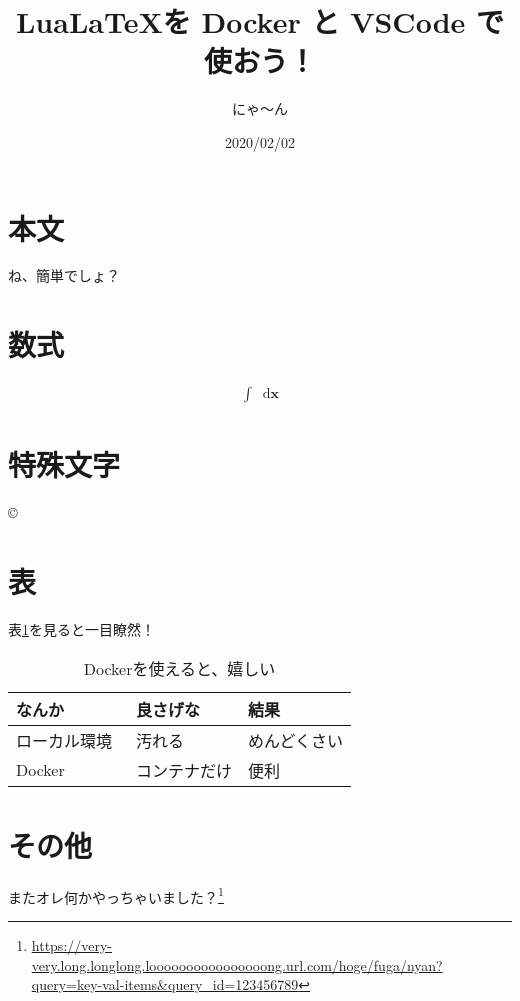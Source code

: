 \documentclass[a4paper,10pt]{ltjsarticle}
\title{Lua\LaTeX を Docker と VSCode で使おう！}
\author{にゃ〜ん}
\date{2020/02/02}
\newcommand*\diff[1]{\mathop{}\!\mathrm{d}#1}
\begin{document}
\maketitle

\tableofcontents
\thispagestyle{empty}
\newpage

\setcounter{page}{1}
\section{本文}
ね、簡単でしょ？

\section{数式}
\begin{align*}
\int \diff{\bm{x}}
\end{align*}

\section{特殊文字}
\copyright
\textyen
\textregistered

\section{表}
表\ref{table:table1}を見ると一目瞭然！

\begin{table}[tb]
\caption{Dockerを使えると、嬉しい}\label{table:table1}
\begin{center}
\begin{tabularx}{\linewidth}{@{}XXX@{}} \toprule
なんか & 良さげな & 結果 \\ \midrule
ローカル環境~\cite{local} & 汚れる & めんどくさい \\
Docker~\cite{docker} & コンテナだけ & 便利 \\\bottomrule
\end{tabularx}
\end{center}
\end{table}

\section{その他}
またオレ何かやっちゃいました？\footnote{\url{https://very-very.long.longlong.loooooooooooooooong.url.com/hoge/fuga/nyan?query=key-val-items&query_id=123456789}}



\end{document}
